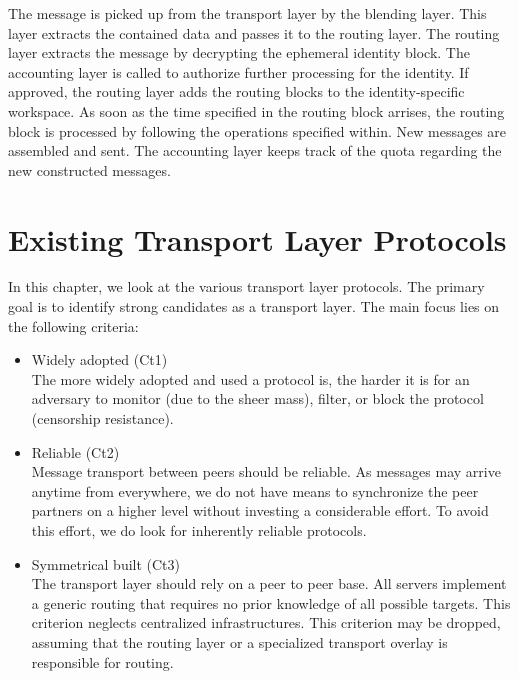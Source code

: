 The message is picked up from the transport layer by the blending layer. This layer extracts the contained data and passes it to the routing layer. The routing layer extracts the message by decrypting the ephemeral identity block. The accounting layer is called to authorize further processing for the identity. If approved, the routing layer adds the routing blocks to the identity-specific workspace. As soon as the time specified in the routing block arrises, the routing block is processed by following the operations specified within. New messages are assembled and sent. The accounting layer keeps track of the quota regarding the new constructed messages. 

\chapter{Existing Transport Layer Protocols \label{sec:existingTPP}}
In this chapter, we look at the various transport layer protocols. The primary goal is to identify strong candidates as a transport layer. The main focus lies on the following criteria:
\begin{itemize}
	\item Widely adopted (Ct1)\\
	The more widely adopted and used a protocol is, the harder it is for an adversary to monitor (due to the sheer mass), filter, or block the protocol (censorship resistance).
	\item Reliable (Ct2)\\
	Message transport between peers should be reliable. As messages may arrive anytime from everywhere, we do not have means to synchronize the peer partners on a higher level without investing a considerable effort. To avoid this effort, we do look for inherently reliable protocols.
	\item Symmetrical built (Ct3)\\
	The transport layer should rely on a peer to peer base. All servers implement a generic routing that requires no prior knowledge of all possible targets. This criterion neglects centralized infrastructures. This criterion may be dropped, assuming that the routing layer or a specialized transport overlay is responsible for routing.
\end{itemize}


